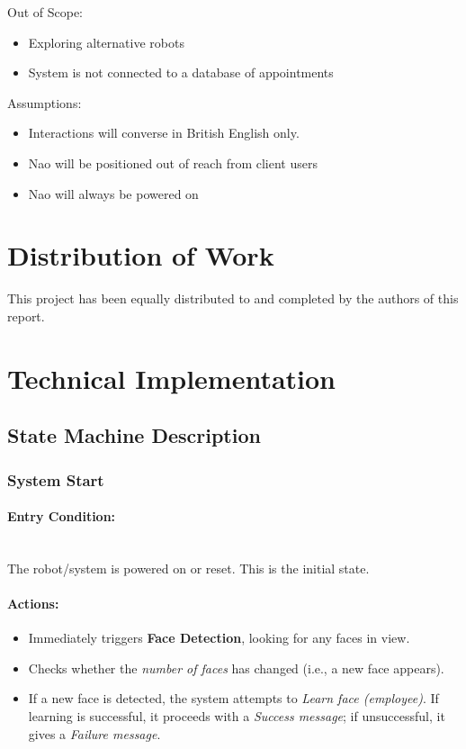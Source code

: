 \documentclass[conference]{IEEEtran}
\begin{document}
Out of Scope:
\begin{itemize}
        \item Exploring alternative robots
        \item System is not connected to a database of appointments 
\end{itemize}

Assumptions:
\begin{itemize}
        \item Interactions will converse in British English only.
        \item Nao will be positioned out of reach from client users
        \item Nao will always be powered on
\end{itemize}

\section{Distribution of Work} This project has been equally distributed to and completed by the authors of this report.

\section{Technical Implementation}

\subsection{State Machine Description}

\subsubsection{System Start}
\paragraph{Entry Condition:}
\mbox{}\\
The robot/system is powered on or reset. This is the initial state.

\paragraph{Actions:}
\begin{itemize}
  \item Immediately triggers \textbf{Face Detection}, looking for any faces in view.
  \item Checks whether the \emph{number of faces} has changed (i.e., a new face appears).
  \item If a new face is detected, the system attempts to \emph{Learn face (employee)}. If learning is successful, it proceeds with a \emph{Success message}; if unsuccessful, it gives a \emph{Failure message}.
\end{itemize}
\end{document}
